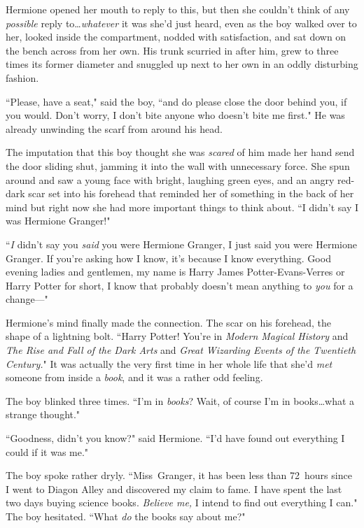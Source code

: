 Hermione opened her mouth to reply to this, but then she couldn't think of any \emph{possible} reply to…\emph{whatever} it was she'd just heard, even as the boy walked over to her, looked inside the compartment, nodded with satisfaction, and sat down on the bench across from her own. His trunk scurried in after him, grew to three times its former diameter and snuggled up next to her own in an oddly disturbing fashion.

``Please, have a seat," said the boy, ``and do please close the door behind you, if you would. Don't worry, I don't bite anyone who doesn't bite me first." He was already unwinding the scarf from around his head.

The imputation that this boy thought she was \emph{scared} of him made her hand send the door sliding shut, jamming it into the wall with unnecessary force. She spun around and saw a young face with bright, laughing green eyes, and an angry red-dark scar set into his forehead that reminded her of something in the back of her mind but right now she had more important things to think about. ``I didn't say I was Hermione Granger!"

``\emph{I} didn't say you \emph{said} you were Hermione Granger, I just said you were Hermione Granger. If you're asking how I know, it's because I know everything. Good evening ladies and gentlemen, my name is Harry James Potter-Evans-Verres or Harry Potter for short, I know that probably doesn't mean anything to \emph{you} for a change—"

Hermione's mind finally made the connection. The scar on his forehead, the shape of a lightning bolt. ``Harry Potter! You're in \emph{Modern Magical History} and \emph{The Rise and Fall of the Dark Arts} and \emph{Great Wizarding Events of the Twentieth Century.}" It was actually the very first time in her whole life that she'd \emph{met} someone from inside a \emph{book}, and it was a rather odd feeling.

The boy blinked three times. ``I'm in \emph{books}? Wait, of course I'm in books…what a strange thought."

``Goodness, didn't you know?" said Hermione. ``I'd have found out everything I could if it was me."

The boy spoke rather dryly. ``Miss~Granger, it has been less than 72~hours since I went to Diagon Alley and discovered my claim to fame. I have spent the last two days buying science books. \emph{Believe me,} I intend to find out everything I can." The boy hesitated. ``What \emph{do} the books say about me?"

